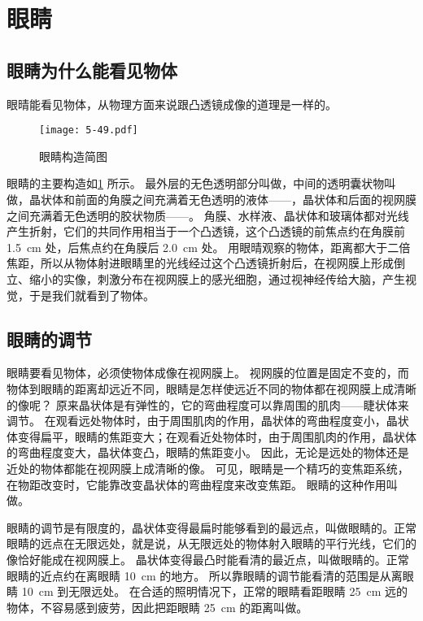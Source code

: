 \section{眼睛}
\subsection{眼睛为什么能看见物体}
眼晴能看见物体，从物理方面来说跟凸透镜成像的道理是一样的。
\begin{figure}
  \texttt{[image: 5-49.pdf]}
  \caption{眼睛构造简图}\label{fig:5-49}
\end{figure}

眼睛的主要构造如\cref{fig:5-49} 所示。
最外层的无色透明部分叫做，中间的透明囊状物叫做，晶状体和前面的角膜之间充满着无色透明的液体——，晶状体和后面的视网膜之间充满着无色透明的胶状物质——。
角膜、水样液、晶状体和玻璃体都对光线产生折射，它们的共同作用相当于一个凸透镜，这个凸透镜的前焦点约在角膜前 \qty{1.5}{cm} 处，后焦点约在角膜后 \qty{2.0}{cm} 处。
用眼晴观察的物体，距离都大于二倍焦距，所以从物体射进眼睛里的光线经过这个凸透镜折射后，在视网膜上形成倒立、缩小的实像，刺激分布在视网膜上的感光细胞，通过视神经传给大脑，产生视觉，于是我们就看到了物体。

\subsection{眼睛的调节}

眼睛要看见物体，必须使物体成像在视网膜上。
视网膜的位置是固定不变的，而物体到眼睛的距离却远近不同，眼睛是怎样使远近不同的物体都在视网膜上成清晰的像呢？
原来晶状体是有弹性的，它的弯曲程度可以靠周围的肌肉——睫状体来调节。
在观看远处物体时，由于周围肌肉的作用，晶状体的弯曲程度变小，晶状体变得扁平，眼睛的焦距变大；在观看近处物体时，由于周围肌肉的作用，晶状体的弯曲程度变大，晶状体变凸，眼睛的焦距变小。
因此，无论是远处的物体还是近处的物体都能在视网膜上成清晰的像。
可见，眼睛是一个精巧的变焦距系统，在物距改变时，它能靠改变晶状体的弯曲程度来改变焦距。
眼睛的这种作用叫做。

眼睛的调节是有限度的，晶状体变得最扁时能够看到的最远点，叫做眼睛的。正常眼睛的远点在无限远处，就是说，从无限远处的物体射入眼睛的平行光线，它们的像恰好能成在视网膜上。
晶状体变得最凸时能看清的最近点，叫做眼睛的。正常眼睛的近点约在离眼睛 \qty{10}{cm} 的地方。
所以靠眼睛的调节能看清的范围是从离眼睛 \qty{10}{cm} 到无限远处。
在合适的照明情况下，正常的眼睛看距眼睛 \qty{25}{cm} 远的物体，不容易感到疲劳，因此把距眼睛 \qty{25}{cm} 的距离叫做。

